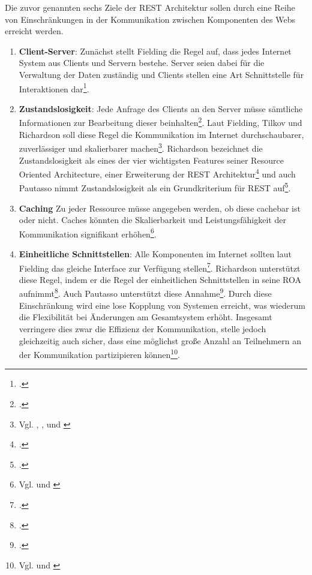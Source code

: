 Die zuvor genannten sechs Ziele der REST Architektur sollen durch eine Reihe von Einschränkungen in der Kommunikation zwischen Komponenten des Webs erreicht werden.

\begin{enumerate}
    \item \textbf{Client-Server}: Zunächst stellt Fielding die Regel auf, dass jedes Internet System aus Clients und Servern bestehe. Server seien dabei für die Verwaltung der Daten zuständig und Clients stellen eine Art Schnittstelle für Interaktionen dar\footcite[Vgl. ][S. 78]{fielding_architectural_2000}.
    \item \textbf{Zustandslosigkeit}: Jede Anfrage des Clients an den Server müsse sämtliche Informationen zur Bearbeitung dieser beinhalten\footcite[Vgl. ][S. 10]{tilkov_rest_2015}. Laut Fielding, Tilkov und Richardson soll diese Regel die Kommunikation im Internet durchschaubarer, zuverlässiger und skalierbarer machen\footnote{Vgl. \cite[S. 78]{fielding_architectural_2000}, \cite[S. 4]{tilkov_rest_2015}, \cite[S. 119]{tilkov_rest_2015} und \cite[S. 86]{richardson_restful_2007}}. Richardson bezeichnet die Zustandslosigkeit als eines der vier wichtigsten Features seiner Resource Oriented Architecture, einer Erweiterung der REST Architektur\footcite[Vgl. ][S. 86]{richardson_restful_2007} und auch Pautasso nimmt Zustandslosigkeit als ein Grundkriterium für REST auf\footcite[Vgl. ][S. 3]{pautasso_restful_2014}. 
    \item \textbf{Caching} Zu jeder Ressource müsse angegeben werden, ob diese cachebar ist oder nicht. Caches könnten die Skalierbarkeit und Leistungsfähigkeit der Kommunikation signifikant erhöhen\footnote{Vgl. \cite[S. 4]{tilkov_rest_2015} und \cite[S. 127]{tilkov_rest_2015}}.
    \item \textbf{Einheitliche Schnittstellen}: Alle Komponenten im Internet sollten laut Fielding das gleiche Interface zur Verfügung stellen\footcite[Vgl. ][S. 81f]{fielding_architectural_2000}. Richardson unterstützt diese Regel, indem er die Regel der einheitlichen Schnittstellen in seine ROA aufnimmt\footcite[Vgl. ][S. 105]{richardson_restful_2007}. Auch Pautasso unterstützt diese Annahme\footcite[Vgl. ][S. 3]{pautasso_restful_2008}. Durch diese Einschränkung wird eine lose Kopplung von Systemen erreicht, was wiederum die Flexibilität bei Änderungen am Gesamtsystem erhöht. Insgesamt verringere dies zwar die Effizienz der Kommunikation, stelle jedoch gleichzeitig auch sicher, dass eine möglichst große Anzahl an Teilnehmern an der Kommunikation partizipieren können\footnote{Vgl. \cite[S. 2]{tilkov_rest_2015} und \cite[S. 81f]{fielding_architectural_2000}}.

\end{enumerate}
